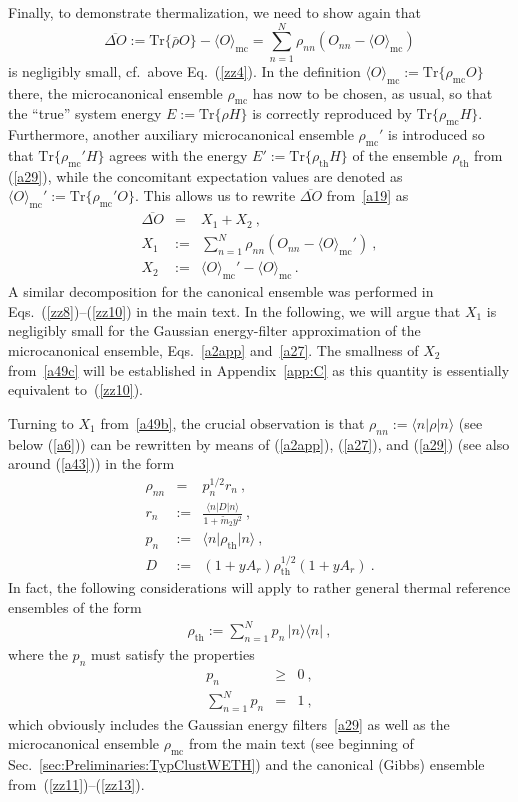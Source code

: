 \documentclass[twocolumn,aps,prb,floatfix,superscriptaddress]{revtex4-2}
\newcommand{\ket}[1]{\lvert #1 \rangle} 	%
\newcommand{\bra}[1]{\langle #1 \rvert}	%
\newcommand{\<}{\left\langle}	%
\renewcommand{\>}{\right\rangle}	%
\newcommand{\Pc}{\rho_{\mathrm{th}}}
\newcommand{\tr}{\mbox{Tr}}
\newcommand{\Omc}{\langle O\rangle_{\!\mathrm{mc}}}
\newcommand{\rhomic}{\rho_{\mathrm{mc}}}
\newcommand{\rhoth}{\rho_{\mathrm{th}}}
\newcommand{\mref}[1]{\ref{#1}}
\begin{document}
Finally,
to demonstrate thermalization,
we need to show again that
\begin{equation}
\overline{\Delta O} := \tr\{\bar\rho O\} - \Omc
= \sum_{n=1}^N \rho_{nn} (O_{nn}-\Omc)
\label{a19}
\end{equation}
is negligibly small,
cf.\ above Eq.~(\mref{zz4}).
In the definition
$\Omc:=\tr\{\rhomic O\}$ there, the microcanonical
ensemble $\rhomic$ has now to be chosen, as usual,
so that the ``true'' system energy $E:=\tr\{\rho H\}$
is correctly reproduced by $\tr\{\rhomic H\}$.
Furthermore,
another auxiliary microcanonical ensemble
$\rhomic'$ is
introduced
so that $\tr\{\rhomic' H\}$ agrees
with the energy $E':=\tr\{\Pc H\}$ of the ensemble $\Pc$ 
from 
(\ref{a29}),
while the concomitant expectation values 
are denoted as $\Omc':=\tr\{\rhomic' O\}$.
This allows us to rewrite $\overline{\Delta O}$ from~\eqref{a19} as
\begin{eqnarray}
\overline{\Delta O} & = & X_1+X_2
\ ,
\label{a49a}
\\
X_1 & := &  \sum_{n=1}^N \rho_{nn} (O_{nn}-\Omc')
\ ,
\label{a49b}
\\
X_2 & := & \Omc'-\Omc \,.
\label{a49c}
\end{eqnarray}
A similar decomposition for the canonical ensemble was performed 
in Eqs.~(\mref{zz8})--(\mref{zz10}) in the main text.
In the following, we will argue that $X_1$ is negligibly small for 
the Gaussian energy-filter approximation of the microcanonical ensemble, 
Eqs.~\eqref{a2app} and~\eqref{a27}.
The smallness of $X_2$ from~\eqref{a49c} will be established in 
Appendix~\ref{app:C} as this quantity is essentially equivalent to~(\mref{zz10}).

Turning to $X_1$ from~\eqref{a49b},
the crucial
observation is 
that $\rho_{nn}:=\langle n| \rho|n\rangle$
(see below (\ref{a6})) can be rewritten
by means of
(\ref{a2app}), (\ref{a27}), and (\ref{a29})
(see also around (\ref{a43}))
in the form
\begin{eqnarray}
\rho_{nn} & = & p_n^{1/2} r_n
\ ,
\label{a50}
\\
r_n & := & \frac{\langle n| D |n\rangle}{1+\tilde m_2 y^2}
\ ,
\label{a50a}
\\
p_n & := & \bra{n} \rhoth \ket{n}
\ ,
\\
D & := & (1 + y A_r) \rhoth^{1/2} (1 + y A_r)
\ .
\end{eqnarray}
In fact,
the following considerations will apply to rather general thermal reference ensembles of the form
\begin{eqnarray}
\Pc :=\sum_{n=1}^N p_n \, |n\rangle\langle n|
\ ,
\label{a30}
\end{eqnarray}
where the $p_n$ must satisfy the properties
\begin{eqnarray}
p_n & \geq & 0 \ ,
\label{a31}
\\
\sum_{n=1}^N p_n & = & 1
\ ,
\label{a32}
\end{eqnarray}
which obviously includes the Gaussian energy filters~\eqref{a29}
as well as the microcanonical ensemble $\rhomic$ from the main 
text (see beginning of
Sec.~\ref{sec:Preliminaries:TypClustWETH})
and the canonical (Gibbs) ensemble from~(\mref{zz11})--(\mref{zz13}).
\end{document}
